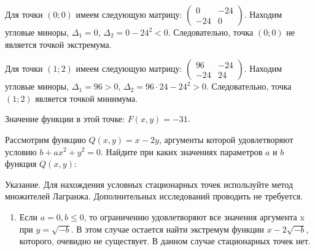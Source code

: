 \documentclass[addpoints, answers]{exam} %
\begin{document}
\begin{questions}
\begin{solution}
Для точки  $(0;0)$ имеем следующую матрицу:
$\begin{pmatrix}
0 & -24 \\
-24 & 0
\end{pmatrix}$.
Находим угловые миноры, $\Delta_1=0$, $\Delta_2=0-24^2<0$. Следовательно, точка $(0;0)$  не является точкой экстремума.


Для точки $(1;2)$  имеем следующую матрицу:
$\begin{pmatrix}
96 & -24 \\
-24 & 24
\end{pmatrix}.$
Находим угловые миноры, $\Delta_1=96>0$, $\Delta_2=96\cdot 24 -24^2>0$.  Следовательно, точка $(1;2)$  является точкой минимума.

Значение функции в этой точке: $F(x,y)=-31$.
\end{solution}

\question Рассмотрим функцию $Q(x,y)=x-2y$, аргументы которой удовлетворяют условию $b+ax^2+y^2=0$.
Найдите при каких значениях параметров $a$ и $b$  функция $Q(x,y)$:


Указание. Для нахождения условных стационарных точек используйте метод множителей Лагранжа. Дополнительных исследований проводить не требуется.


\begin{solution}

\begin{enumerate}
\item Если $a=0,b\le 0$, то ограничению удовлетворяют все значения аргумента x при $y=\sqrt{-b} $. В этом случае остается найти экстремум функции $x-2\sqrt{-b} $, которого, очевидно не существует. В данном случае стационарных точек нет.


\end{enumerate}
\end{solution}
\end{questions}
\end{document}
